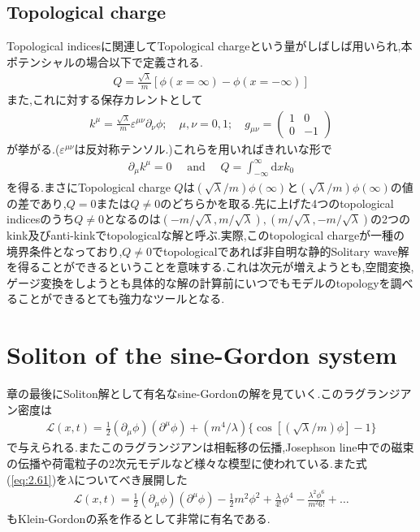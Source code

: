 \documentclass[dvipdfmx,11pt,a4paper,oneside,openany]{jsbook}
\begin{document}
\subsection{Topological charge}
Topological indicesに関連してTopological chargeという量がしばしば用いられ,本ポテンシャルの場合以下で定義される.
\begin{align}
    Q=\frac{\sqrt{\lambda}}{m}[\phi(x=\infty)-\phi(x=-\infty)]
\end{align}
また,これに対する保存カレントとして
\begin{align}
    k^{\mu}=\frac{\sqrt{\lambda}}{m} \varepsilon^{\mu \nu} \partial_{\nu} \phi;\quad \mu,\nu=0,1;\quad g_{\mu \nu}=
    \begin{pmatrix}
        1 & 0  \\
        0 & -1
    \end{pmatrix}
\end{align}
が挙がる.($\varepsilon^{\mu\nu}$は反対称テンソル.)これらを用いればきれいな形で
\begin{align}
    \partial_{\mu} k^{\mu}=0 \quad \text { and } \quad Q=\int_{-\infty}^{\infty} \mathrm{d} x k_{0}
\end{align}
を得る.まさにTopological charge $Q$は$(\sqrt{\lambda}/m)\phi(\infty)$と$(\sqrt{\lambda}/m)\phi(\infty)$の値の差であり,$Q=0$または$Q\neq 0$のどちらかを取る.先に上げた4つのtopological indicesのうち$Q\neq0$となるのは$(-m/\sqrt{\lambda},m/\sqrt{\lambda}),(m/\sqrt{\lambda},-m/\sqrt{\lambda})$の2つのkink及びanti-kinkでtopologicalな解と呼ぶ.実際,このtopological chargeが一種の境界条件となっており,$Q\neq0$でtopologicalであれば非自明な静的Solitary wave解を得ることができるということを意味する.これは次元が増えようとも,空間変換,ゲージ変換をしようとも具体的な解の計算前にいつでもモデルのtopologyを調べることができるとても強力なツールとなる.

\section{Soliton of the sine-Gordon system}
章の最後にSoliton解として有名なsine-Gordonの解を見ていく.このラグランジアン密度は
\begin{align}
    \mathscr{L}(x, t)=\frac{1}{2}\left(\partial_{\mu} \phi\right)\left(\partial^{\mu} \phi\right)+\left(m^{4} / \lambda\right)\{\cos [(\sqrt{\lambda} / m) \phi]-1\}\label{eq:2.61}
\end{align}
で与えられる.またこのラグランジアンは相転移の伝播,Josephson line中での磁束の伝播や荷電粒子の2次元モデルなど様々な模型に使われている.また式(\ref{eq:2.61})を$\lambda$についてべき展開した
\begin{align}
    \mathscr{L}(x, t)=\frac{1}{2}\left(\partial_{\mu} \phi\right)\left(\partial^{\mu} \phi\right)-\frac{1}{2} m^{2} \phi^{2}+\frac{\lambda}{4 !} \phi^{4}-\frac{\lambda^{2} \phi^{6}}{m^{2} 6 !}+\ldots
\end{align}
もKlein-Gordonの系を作るとして非常に有名である.
\end{document}
